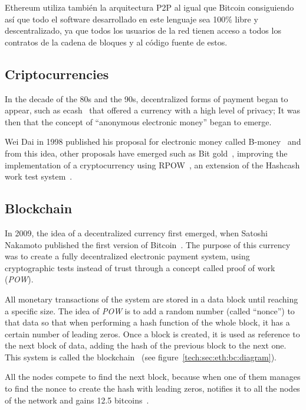 Ethereum utiliza también la arquitectura P2P al igual que Bitcoin consiguiendo
así que todo el software desarrollado en este lenguaje sea 100\% libre y
descentralizado, ya que todos los usuarios de la red tienen acceso a todos los
contratos de la cadena de bloques y al código fuente de estos.
\subsection{Criptocurrencies}
\label{tb:cryptos}
In the decade of the 80s and the 90s, decentralized forms of payment began to
appear, such as ecash~\cite{chaum1995introduction} that offered a currency with a high level
of privacy; It was then that the concept of ``anonymous electronic money'' began
to emerge.

Wei Dai in 1998 published his proposal for electronic money called
B-money~\cite{bmoney} and from this idea, other proposals have emerged such as
Bit gold~\cite{bitgold}, improving the implementation of a cryptocurrency using
RPOW~\cite{finney2005rpow}, an extension of the Hashcash work test
system~\cite{back2002hashcash}.

\subsection{Blockchain}
\label{tb:cryptos:bc}
In 2009, the idea of a decentralized currency first emerged, when Satoshi
Nakamoto published the first version of Bitcoin~\cite{nakamoto2008bitcoin}. The
purpose of this currency was to create a fully decentralized electronic payment
system, using cryptographic tests instead of trust through a concept called
proof of work (\emph{POW}).

All monetary transactions of the system are stored in a data block until
reaching a specific size. The idea of \emph{POW} is to add a random number
(called ``nonce'') to that data so that when performing a hash function of the
whole block, it has a certain number of leading zeros. Once a block is created,
it is used as reference to the next block of data, adding the hash of the
previous block to the next one. This system is called the
blockchain~\cite{antonopoulos2014mastering} (see
figure~\ref{tech:sec:eth:bc:diagram}).


All the nodes compete to find the next block, because when one of them manages
to find the nonce to create the hash with leading zeros, notifies it to all the
nodes of the network and gains 12.5 bitcoins~\cite{barber2012bitter}.

